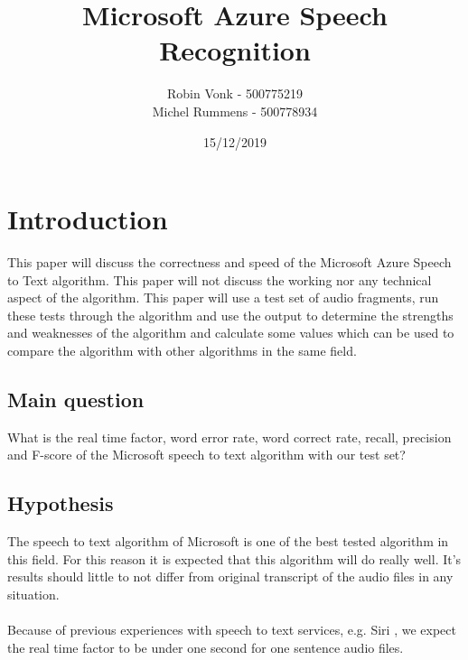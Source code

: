 \documentclass{article}
\begin{document}
\title{Microsoft Azure Speech Recognition}
\author{Robin Vonk - 500775219 \\
		Michel Rummens - 500778934 \\}
\date{15/12/2019}

\setlength{\columnsep}{30px}


\tableofcontents
\section{Introduction}
This paper will discuss the correctness and speed of the Microsoft Azure Speech to Text algorithm. This paper will not discuss the working nor any technical aspect of the algorithm. This paper will use a test set of audio fragments, run these tests through the algorithm and use the output to determine the strengths and weaknesses of the algorithm and calculate some values which can be used to compare the algorithm with other algorithms in the same field.

\subsection{Main question}
What is the real time factor, word error rate, word correct rate, recall, precision and F-score of the Microsoft speech to text algorithm with our test set?

\subsection{Hypothesis}
The speech to text algorithm of Microsoft is one of the best tested algorithm in this field\cite{Veton}. For this reason it is expected that this algorithm will do really well. It's results should little to not differ from original transcript of the audio files in any situation. \\ \\
Because of previous experiences with speech to text services, e.g. Siri \cite{Siri}, we expect the real time factor to be under one second for one sentence audio files.
\end{document}
